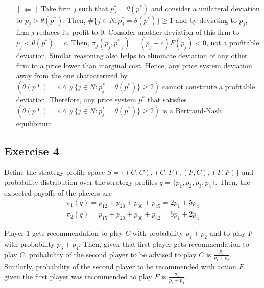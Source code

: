 \documentclass[]{article}
\begin{document}
\begin{itemize}
	\item[$\begin{bmatrix}\Leftarrow\end{bmatrix}$] Take firm $j$ such that $p_j^* = \theta(p^*)$ and consider a unilateral deviation to $\tilde{p}_j > \theta(p^*)$. Then, $\#\{j\in N: p_j^* = \theta(p^*)\}\geq1$ and by deviating to $\tilde{p}_j$, firm $j$ reduces its profit to 0. Consider another deviation of this firm to $\tilde{p}_j < \theta(p^*) = c$. Then, $\pi_j(\tilde{p}_j, p_{-j}^*) = (\tilde{p}_j - c)F(\tilde{p}_j) < 0$, not a profitable deviation. Similar reasoning also helps to eliminate deviation of any other firm to a price lower than marginal cost. Hence, any price system deviation away from the one characterized by $(\theta(p*) = c \wedge \#\{j\in N: p_j^* = \theta(p^*)\}\geq2)$ cannot constitute a profitable deviation. Therefore, any price system $p^*$ that satisfies $(\theta(p*) = c \wedge \#\{j\in N: p_j^* = \theta(p^*)\}\geq2)$ is a Bertrand-Nash equilibrium.
\end{itemize}

\subsection*{Exercise 4}

Define the strategy profile space $S = \{(C, C), (C, F), (F, C), (F, F)\}$ and probability distribution over the strategy profiles $q = \{p_1, p_2, p_3, p_4\}$. Then, the expected payoffs of the players are
\begin{equation}
	\begin{split}
		\pi_1(q) = p_12 + p_20 + p_30 + p_45 = 2p_1 + 5p_4 \\ \nonumber
		\pi_2(q) = p_15 + p_20 + p_30 + p_42 = 5p_1 + 2p_4
	\end{split}
\end{equation}

Player 1 gets recommendation to play $C$ with probability $p_1 + p_2$ and to play $F$ with probability $p_3 + p_4$. Then, given that first player gets recommendation to play $C$, probability of the second player to be advised to play $C$ is $\frac{p_1}{p_1 + p_2}$. Similarly, probability of the second player to be recommended with action $F$ given the first player was recommended to play $F$ is $\frac{p_4}{p_3 + p_4}$.
\end{document}
